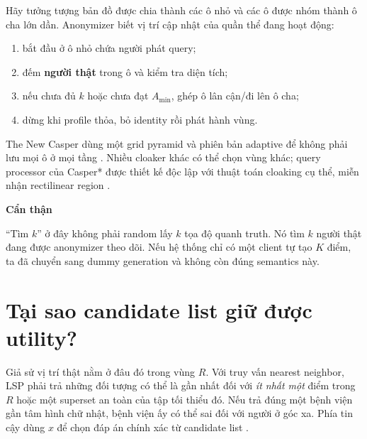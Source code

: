 \documentclass[11pt,a4paper,oneside]{report}
\newenvironment{warningbox}[1][Cẩn thận]{%
  \par\medskip\noindent\begin{lrbox}{\warningstore}\begin{minipage}{.89\textwidth}
  {\sffamily\bfseries\color{red}#1}\par\smallskip}{%
  \end{minipage}\end{lrbox}\begin{center}\setlength{\fboxsep}{7pt}%
  \fcolorbox{red}{lightred}{\usebox{\warningstore}}\end{center}\medskip}
\begin{document}
Hãy tưởng tượng bản đồ được chia thành các ô nhỏ và các ô được nhóm thành ô cha
lớn dần. Anonymizer biết vị trí cập nhật của quần thể đang hoạt động:

\begin{enumerate}
  \item bắt đầu ở ô nhỏ chứa người phát query;
  \item đếm \textbf{người thật} trong ô và kiểm tra diện tích;
  \item nếu chưa đủ $k$ hoặc chưa đạt $A_{\min}$, ghép ô lân cận/đi lên ô cha;
  \item dừng khi profile thỏa, bỏ identity rồi phát hành vùng.
\end{enumerate}

The New Casper dùng một grid pyramid và phiên bản adaptive để không phải lưu mọi ô
ở mọi tầng \cite{mokbel2006casper}. Nhiều cloaker khác có thể chọn vùng khác; query
processor của Casper* được thiết kế độc lập với thuật toán cloaking cụ thể, miễn
nhận rectilinear region \cite{chow2009casper}.

\begin{warningbox}
``Tìm $k$'' ở đây không phải random lấy $k$ tọa độ quanh truth. Nó tìm $k$ người
thật đang được anonymizer theo dõi. Nếu hệ thống chỉ có một client tự tạo $K$ điểm,
ta đã chuyển sang dummy generation và không còn đúng semantics này.
\end{warningbox}

\section{Tại sao candidate list giữ được utility?}

Giả sử vị trí thật nằm ở đâu đó trong vùng $R$. Với truy vấn nearest neighbor,
LSP phải trả những đối tượng có thể là gần nhất đối với \emph{ít nhất một} điểm
trong $R$ hoặc một superset an toàn của tập tối thiểu đó. Nếu trả đúng một bệnh
viện gần tâm hình chữ nhật, bệnh viện ấy có thể sai đối với người ở góc xa. Phía
tin cậy dùng $x$ để chọn đáp án chính xác từ candidate list
\cite{chow2009casper}.
\end{document}
